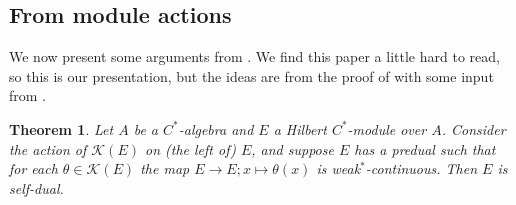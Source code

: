 \documentclass[a4paper,11pt]{article}
\theoremstyle{plain}
\newtheorem{theorem}[proposition]{Theorem}
\theoremstyle{remark}
\newcommand{\mc}[1]{\mathcal{#1}}
\begin{document}
\subsection{From module actions}

We now present some arguments from \cite[Section~2]{Schweizer_HilbModsPredual}.  We find this paper a little hard to read, so this is our presentation, but the ideas are from the proof of \cite[Theorem~2.6]{Schweizer_HilbModsPredual} with some input from \cite{BlecherLeMerdy_Book}.

\begin{theorem}\label{thm:cmpt_action_selfdual}
Let $A$ be a $C^*$-algebra and $E$ a Hilbert $C^*$-module over $A$.  Consider the action of $\mc K(E)$ on (the left of) $E$, and suppose $E$ has a predual such that for each $\theta\in\mc K(E)$ the map $E\to E; x\mapsto \theta(x)$ is weak$^*$-continuous.  Then $E$ is self-dual.
\end{theorem}
\end{document}
